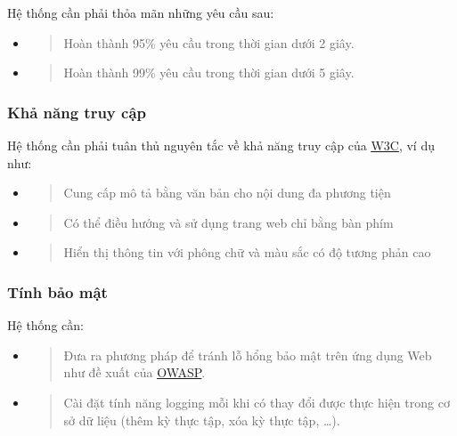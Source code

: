 \documentclass[./../main.tex]{subfiles}
\begin{document}
Hệ thống cần phải thỏa mãn những yêu cầu sau:

\begin{itemize}
	\item
	      \begin{quote}
	      	Hoàn thành 95\% yêu cầu trong thời gian dưới 2 giây.
	      \end{quote}
	\item
	      \begin{quote}
	      	Hoàn thành 99\% yêu cầu trong thời gian dưới 5 giây.
	      \end{quote}
\end{itemize}

\hypertarget{khux1ea3-nux103ng-truy-cux1eadp}{%
	\subsubsection{Khả năng truy cập}\label{khux1ea3-nux103ng-truy-cux1eadp}}

Hệ thống cần phải tuân thủ nguyên tắc về khả năng truy cập của
\href{https://www.w3.org/WAI/fundamentals/accessibility-principles/}{\underline{W3C}},
ví dụ như:

\begin{itemize}
	\item
	      \begin{quote}
	      	Cung cấp mô tả bằng văn bản cho nội dung đa phương tiện
	      \end{quote}
	\item
	      \begin{quote}
	      	Có thể điều hướng và sử dụng trang web chỉ bằng bàn phím
	      \end{quote}
	\item
	      \begin{quote}
	      	Hiển thị thông tin với phông chữ và màu sắc có độ tương phản cao
	      \end{quote}
\end{itemize}

\hypertarget{tuxednh-bux1ea3o-mux1eadt}{%
	\subsubsection{Tính bảo mật}\label{tuxednh-bux1ea3o-mux1eadt}}

Hệ thống cần:

\begin{itemize}
	\item
	      \begin{quote}
	      	Đưa ra phương pháp để tránh lỗ hổng bảo mật trên ứng dụng Web như đề
	      	xuất của
	      	\href{https://owasp.org/www-project-top-ten/}{\underline{OWASP}}.
	      \end{quote}
	\item
	      \begin{quote}
	      	Cài đặt tính năng logging mỗi khi có thay đổi được thực hiện trong cơ
	      	sở dữ liệu (thêm kỳ thực tập, xóa kỳ thực tập, \ldots).
	      \end{quote}
\end{itemize}
\end{document}
